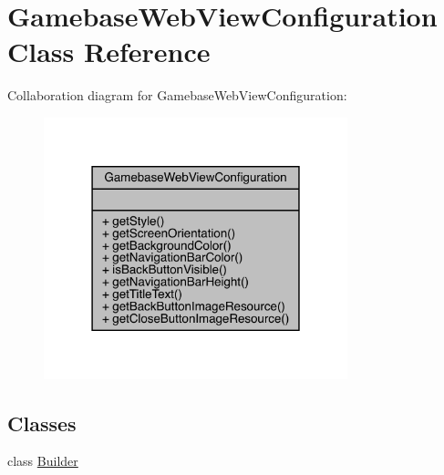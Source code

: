 \hypertarget{classcom_1_1toast_1_1android_1_1gamebase_1_1_gamebase_web_view_configuration}{}\section{Gamebase\+Web\+View\+Configuration Class Reference}
\label{classcom_1_1toast_1_1android_1_1gamebase_1_1_gamebase_web_view_configuration}


Collaboration diagram for Gamebase\+Web\+View\+Configuration\+:
\nopagebreak
\begin{figure}[H]
\begin{center}
\leavevmode
\includegraphics[width=250pt]{classcom_1_1toast_1_1android_1_1gamebase_1_1_gamebase_web_view_configuration__coll__graph}
\end{center}
\end{figure}
\subsection*{Classes}
\begin{DoxyCompactItemize}
\item 
class \hyperlink{classcom_1_1toast_1_1android_1_1gamebase_1_1_gamebase_web_view_configuration_1_1_builder}{Builder}
\end{DoxyCompactItemize}
